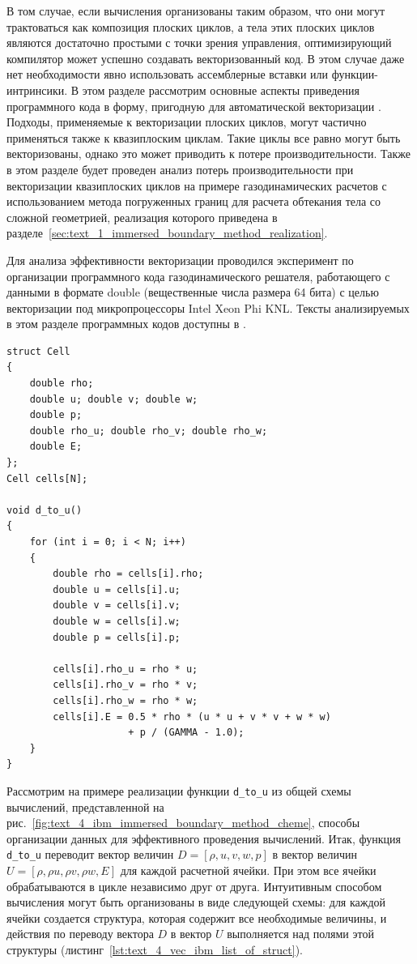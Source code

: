 В том случае, если вычисления организованы таким образом, что они могут трактоваться как композиция плоских циклов, а тела этих плоских циклов являются достаточно простыми с точки зрения управления, оптимизирующий компилятор может успешно создавать векторизованный код.
В этом случае даже нет необходимости явно использовать ассемблерные вставки или функции-интринсики.
В этом разделе рассмотрим основные аспекты приведения программного кода в форму, пригодную для автоматической векторизации \cite{Rybakov2023VecIBM}.
Подходы, применяемые к векторизации плоских циклов, могут частично применяться также к квазиплоским циклам.
Такие циклы все равно могут быть векторизованы, однако это может приводить к потере производительности.
Также в этом разделе будет проведен анализ потерь производительности при векторизации квазиплоских циклов на примере газодинамических расчетов с использованием метода погруженных границ для расчета обтекания тела со сложной геометрией, реализация которого приведена в разделе~\ref{sec:text_1_immersed_boundary_method_realization}.

Для анализа эффективности векторизации проводился эксперимент по организации программного кода газодинамического решателя, работающего с данными в формате double (вещественные числа размера 64 бита) с целью векторизации под микропроцессоры Intel Xeon Phi KNL.
Тексты анализируемых в этом разделе программных кодов доступны в \cite{ibmGithub}.

\begin{lstlisting}[caption={Организация данных в виде <<массив структур>>.},label={lst:text_4_vec_ibm_list_of_struct}]
struct Cell
{
    double rho;
    double u; double v; double w;
    double p;
    double rho_u; double rho_v; double rho_w;
    double E;
};
Cell cells[N];

void d_to_u()
{
    for (int i = 0; i < N; i++)
    {
        double rho = cells[i].rho;
        double u = cells[i].u;
        double v = cells[i].v;
        double w = cells[i].w;
        double p = cells[i].p;

        cells[i].rho_u = rho * u;
        cells[i].rho_v = rho * v;
        cells[i].rho_w = rho * w;
        cells[i].E = 0.5 * rho * (u * u + v * v + w * w)
                     + p / (GAMMA - 1.0);
    }
}
\end{lstlisting}

Рассмотрим на примере реализации функции \texttt{d\_to\_u} из общей схемы вычислений, представленной на рис.~\ref{fig:text_4_ibm_immersed_boundary_method_cheme}, способы организации данных для эффективного проведения вычислений.
Итак, функция \texttt{d\_to\_u} переводит вектор величин $D = [\rho, u, v, w, p]$ в вектор величин $U = [\rho, \rho u, \rho v, \rho w, E]$ для каждой расчетной ячейки.
При этом все ячейки обрабатываются в цикле независимо друг от друга.
Интуитивным способом вычисления могут быть организованы в виде следующей схемы: для каждой ячейки создается структура, которая содержит все необходимые величины, и действия по переводу вектора $D$ в вектор $U$ выполняется над полями этой структуры (листинг~\ref{lst:text_4_vec_ibm_list_of_struct}).

